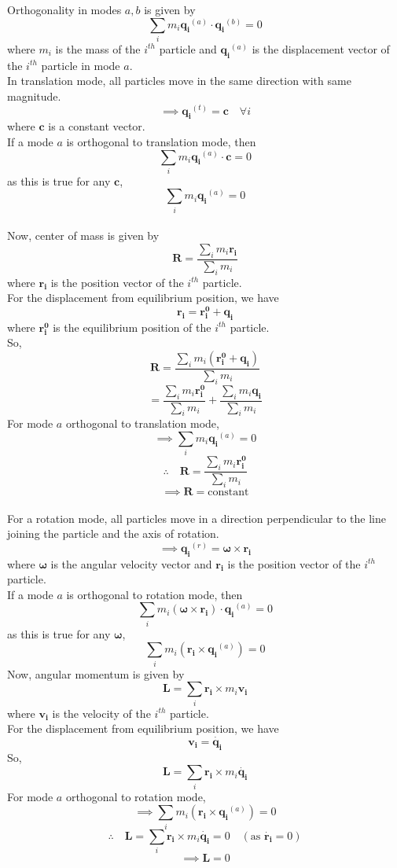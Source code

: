 \item

Orthogonality in modes \(a,b\) is given by
\[\sum_{i} m_i \mathbf{q_i}^{(a)}\cdot \mathbf{q_i}^{(b)} = 0 \]
where \(m_i\) is the mass of the \(i^{th}\) particle and \(\mathbf{q_i}^{(a)}\) is the displacement vector of the \(i^{th}\) particle in mode \(a\).\\
In translation mode, all particles move in the same direction with same magnitude.\\
\[\implies \mathbf{q_i}^{(t)} = \mathbf{c} \quad\forall i\]
where \(\mathbf{c}\) is a constant vector.\\
If a mode \(a\) is orthogonal to translation mode, then
\[\sum_i m_i \mathbf{q_i}^{(a)} \cdot \mathbf{c} = 0\]
as this is true for any \(\mathbf{c}\),
\[\sum_i m_i \mathbf{q_i}^{(a)} = 0\]
\vspace{0.5cm}\\
Now, center of mass is given by
\[\mathbf{R} = \frac{\sum_i m_i \mathbf{r_i}}{\sum_i m_i}\]
where \(\mathbf{r_i}\) is the position vector of the \(i^{th}\) particle.\\
For the displacement from equilibrium position, we have
\[\mathbf{r_i} = \mathbf{r_i^0} + \mathbf{q_i}\]
where \(\mathbf{r_i^0}\) is the equilibrium position of the \(i^{th}\) particle.\\
So,
\[\mathbf{R} = \frac{\sum_i m_i (\mathbf{r_i^0} + \mathbf{q_i})}{\sum_i m_i}\]
\[= \frac{\sum_i m_i \mathbf{r_i^0}}{\sum_i m_i} + \frac{\sum_i m_i \mathbf{q_i}}{\sum_i m_i}\]
For mode \(a\) orthogonal to translation mode,
\[\implies \sum_i m_i \mathbf{q_i}^{(a)} = 0\]
\[\therefore \quad \mathbf{R} = \frac{\sum_i m_i \mathbf{r_i^0}}{\sum_i m_i}\]
\[\implies \mathbf{R} = \text{constant}\]
\vspace{0.5cm}\\
For a rotation mode, all particles move in a direction perpendicular to the line joining the particle and the axis of rotation.\\
\[\implies \mathbf{q_i}^{(r)} = \boldsymbol{\omega} \times \mathbf{r_i}\]
where \(\boldsymbol{\omega}\) is the angular velocity vector and \(\mathbf{r_i}\) is the position vector of the \(i^{th}\) particle.\\
If a mode \(a\) is orthogonal to rotation mode, then
\[\sum_i m_i (\boldsymbol{\omega} \times \mathbf{r_i})\cdot \mathbf{q_i}^{(a)} = 0\]
as this is true for any \(\boldsymbol{\omega}\),
\[\sum_i m_i (\mathbf{r_i} \times \mathbf{q_i}^{(a)}) = 0\]
Now, angular momentum is given by
\[\mathbf{L} = \sum_i \mathbf{r_i} \times m_i \mathbf{v_i}\]
where \(\mathbf{v_i}\) is the velocity of the \(i^{th}\) particle.\\
For the displacement from equilibrium position, we have
\[\mathbf{v_i} = \dot{\mathbf{q_i}}\]
So,
\[\mathbf{L} = \sum_i \mathbf{r_i} \times m_i \dot{\mathbf{q_i}}\]
For mode \(a\) orthogonal to rotation mode,
\[\implies \sum_i m_i (\mathbf{r_i} \times \mathbf{q_i}^{(a)}) = 0\]
\[\therefore \quad \mathbf{L} = \sum_i \mathbf{r_i} \times m_i \dot{\mathbf{q_i}} = 0 \quad(\text{as } \dot{\mathbf{r_i}}=0)\]
\[\implies \mathbf{L} = 0\]

